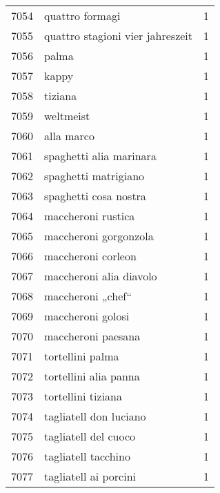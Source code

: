 \begin{tabular}{llr}
7054 &                                    quattro formagi &      1 \\
7055 &                   quattro stagioni vier jahreszeit &      1 \\
7056 &                                              palma &      1 \\
7057 &                                              kappy &      1 \\
7058 &                                            tiziana &      1 \\
7059 &                                          weltmeist &      1 \\
7060 &                                         alla marco &      1 \\
7061 &                            spaghetti alia marinara &      1 \\
7062 &                               spaghetti matrigiano &      1 \\
7063 &                              spaghetti cosa nostra &      1 \\
7064 &                                 maccheroni rustica &      1 \\
7065 &                              maccheroni gorgonzola &      1 \\
7066 &                                 maccheroni corleon &      1 \\
7067 &                            maccheroni alia diavolo &      1 \\
7068 &                                  maccheroni „chef“ &      1 \\
7069 &                                  maccheroni golosi &      1 \\
7070 &                                 maccheroni paesana &      1 \\
7071 &                                   tortellini palma &      1 \\
7072 &                              tortellini alia panna &      1 \\
7073 &                                 tortellini tiziana &      1 \\
7074 &                             tagliatell don luciano &      1 \\
7075 &                               tagliatell del cuoco &      1 \\
7076 &                                tagliatell tacchino &      1 \\
7077 &                              tagliatell ai porcini &      1 \\

\end{tabular}
